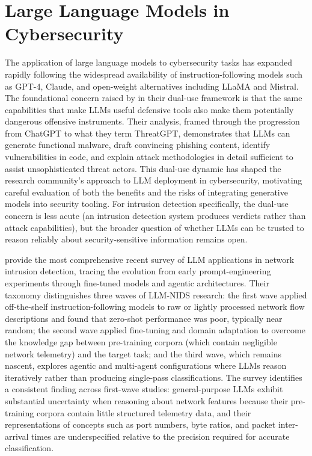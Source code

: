 \documentclass[../main.tex]{subfiles}
\begin{document}
\section{Large Language Models in Cybersecurity}
\label{sec:llm-cybersecurity}

The application of large language models to cybersecurity tasks has expanded rapidly following the widespread availability of instruction-following models such as GPT-4, Claude, and open-weight alternatives including LLaMA and Mistral. The foundational concern raised by \textcite{Gupta2023} in their dual-use framework is that the same capabilities that make LLMs useful defensive tools also make them potentially dangerous offensive instruments. Their analysis, framed through the progression from ChatGPT to what they term ThreatGPT, demonstrates that LLMs can generate functional malware, draft convincing phishing content, identify vulnerabilities in code, and explain attack methodologies in detail sufficient to assist unsophisticated threat actors. This dual-use dynamic has shaped the research community's approach to LLM deployment in cybersecurity, motivating careful evaluation of both the benefits and the risks of integrating generative models into security tooling. For intrusion detection specifically, the dual-use concern is less acute (an intrusion detection system produces verdicts rather than attack capabilities), but the broader question of whether LLMs can be trusted to reason reliably about security-sensitive information remains open.

\textcite{FengSakurai2025} provide the most comprehensive recent survey of LLM applications in network intrusion detection, tracing the evolution from early prompt-engineering experiments through fine-tuned models and agentic architectures. Their taxonomy distinguishes three waves of LLM-NIDS research: the first wave applied off-the-shelf instruction-following models to raw or lightly processed network flow descriptions and found that zero-shot performance was poor, typically near random; the second wave applied fine-tuning and domain adaptation to overcome the knowledge gap between pre-training corpora (which contain negligible network telemetry) and the target task; and the third wave, which remains nascent, explores agentic and multi-agent configurations where LLMs reason iteratively rather than producing single-pass classifications. The survey identifies a consistent finding across first-wave studies: general-purpose LLMs exhibit substantial uncertainty when reasoning about network features because their pre-training corpora contain little structured telemetry data, and their representations of concepts such as port numbers, byte ratios, and packet inter-arrival times are underspecified relative to the precision required for accurate classification.
\end{document}
